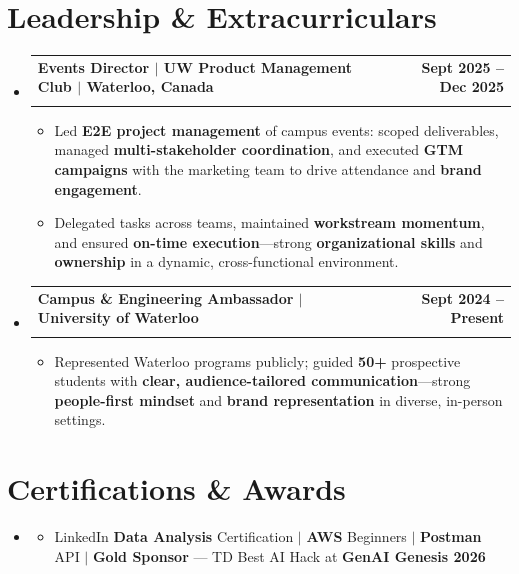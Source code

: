 \documentclass[letterpaper,10pt]{article}
\makeatletter
\newcommand{\resumeItem}[1]{
  \item\small{
    {#1 \vspace{-1pt}}
  }
}
\newcommand{\resumeSubheading}[4]{
  \vspace{-1pt}\item
    \begin{tabular*}{1.0\textwidth}[t]{l@{\extracolsep{\fill}}r}
      \textbf{#1} & \textbf{\small #2} \\
      \textit{\small#3} & \textit{\small #4} \\[-2pt]
    \end{tabular*}\vspace{-7pt}
}
\newcommand{\resumeSubHeadingListStart}{\begin{itemize}[leftmargin=0.0in, label={}]}
\newcommand{\resumeSubHeadingListEnd}{\end{itemize}}
\newcommand{\resumeItemListStart}{\begin{itemize}[leftmargin=0.15in, topsep=0pt, itemsep=0pt, parsep=0pt, partopsep=0pt]}
\newcommand{\resumeItemListEnd}{\end{itemize}\vspace{-3pt}}
\makeatother
\begin{document}
\section{Leadership \& Extracurriculars}
  \resumeSubHeadingListStart
    \resumeSubheading
      {Events Director $|$ UW Product Management Club $|$ Waterloo, Canada}{Sept 2025 -- Dec 2025}
      {}{}
      \vspace{-9pt}
      \resumeItemListStart
        \resumeItem{Led \textbf{E2E project management} of campus events: scoped deliverables, managed \textbf{multi-stakeholder coordination}, and executed \textbf{GTM campaigns} with the marketing team to drive attendance and \textbf{brand engagement}.}
        \resumeItem{Delegated tasks across teams, maintained \textbf{workstream momentum}, and ensured \textbf{on-time execution}---strong \textbf{organizational skills} and \textbf{ownership} in a dynamic, cross-functional environment.}
      \resumeItemListEnd
    \resumeSubheading
      {Campus \& Engineering Ambassador $|$ University of Waterloo}{Sept 2024 -- Present}
      {}{}
      \vspace{-9pt}
      \resumeItemListStart
        \resumeItem{Represented Waterloo programs publicly; guided \textbf{50+} prospective students with \textbf{clear, audience-tailored communication}---strong \textbf{people-first mindset} and \textbf{brand representation} in diverse, in-person settings.}
      \resumeItemListEnd
  \resumeSubHeadingListEnd
\vspace{-6pt}

\section{Certifications \& Awards}
  \resumeSubHeadingListStart
    \item[]
      \resumeItemListStart
        \resumeItem{LinkedIn \textbf{Data Analysis} Certification $|$ \textbf{AWS} Beginners $|$ \textbf{Postman} API $|$ \textbf{Gold Sponsor} --- TD Best AI Hack at \textbf{GenAI Genesis 2026}}
      \resumeItemListEnd
  \resumeSubHeadingListEnd
\end{document}
